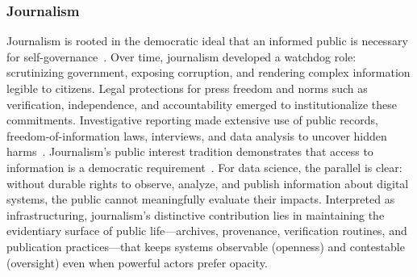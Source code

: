 \documentclass[acmsmall,screen]{acmart}
\begin{document}
\subsubsection*{Journalism}
Journalism is rooted in the democratic ideal that an informed public is necessary for self-governance~\cite{ettemaJournalismReasongivingDeliberative2007,deuzeWhatJournalismProfessional2005}. Over time, journalism developed a watchdog role: scrutinizing government, exposing corruption, and rendering complex information legible to citizens. Legal protections for press freedom and norms such as verification, independence, and accountability emerged to institutionalize these commitments. Investigative reporting made extensive use of public records, freedom-of-information laws, interviews, and data analysis to uncover hidden harms~\cite{glasserInvestigativeJournalismMoral1989,jacquetteJournalismEthicsTruthTelling2009,protessJournalismOutrageInvestigative1992}. Journalism's public interest tradition demonstrates that access to information is a democratic requirement~\cite{zengGhostsNewspapersPublic2022}. For data science, the parallel is clear: without durable rights to observe, analyze, and publish information about digital systems, the public cannot meaningfully evaluate their impacts. Interpreted as infrastructuring, journalism's distinctive contribution lies in maintaining the evidentiary surface of public life---archives, provenance, verification routines, and publication practices---that keeps systems observable (openness) and contestable (oversight) even when powerful actors prefer opacity.
\end{document}
